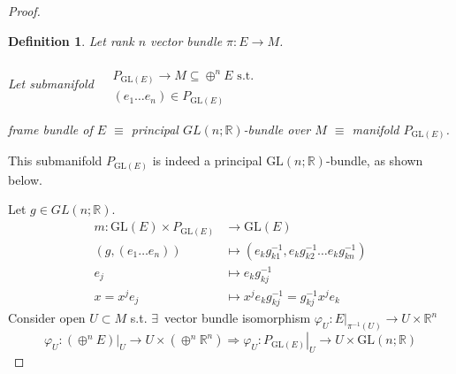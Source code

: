 \documentclass[10pt]{amsart}
\newtheorem{definition}{Definition}
\begin{document}
\begin{multicols*}{2}
\begin{proof}
\begin{definition}
Let rank $n$ vector bundle $\pi : E \to M$.  

Let submanifold $\begin{aligned} & \quad \\
  & P_{\text{GL}(E)} \to M \subseteq \oplus^n E \text{ s.t. } \\
  & (e_1 \dots e_n) \in P_{\text{GL}(E)} \end{aligned}$

\emph{frame bundle of $E$} $\equiv$ principal $GL(n;\mathbb{R})$-bundle over $M$ $\equiv $ manifold $P_{\text{GL}(E)}$. 

\end{definition}
This submanifold $P_{\text{GL}(E)}$ is indeed a principal $\text{GL}(n;\mathbb{R})$-bundle, as shown below.

Let $g\in GL(n;\mathbb{R})$.  
\[
\begin{aligned}
 m: \text{GL}(E) \times P_{\text{GL}(E)}  & \to \text{GL}(E) \\ 
(g, (e_1 \dots e_n)) & \mapsto (e_k g_{k1}^{-1}, e_k g_{k2}^{-1} \dots e_k g_{kn}^{-1} ) \\ 
e_j & \mapsto e_k g_{kj}^{-1} \\ 
x = x^j e_j & \mapsto x^j e_k g_{kj}^{-1} = g_{kj}^{-1}x^j e_k
\end{aligned}
\]
Consider open $U \subset M$ s.t. $\exists \, $ vector bundle isomorphism $\varphi_U : \left. E \right|_{\pi^{-1}(U)} \to U \times \mathbb{R}^n$
\[
\varphi_U : \left. ( \oplus^n E ) \right|_U \to U \times ( \oplus^n \mathbb{R}^n) \Longrightarrow \varphi_U : \left. P_{\text{GL}(E)} \right|_U \to U \times \text{GL}(n;\mathbb{R})
\]

\end{proof}


\end{multicols*}
\end{document}
